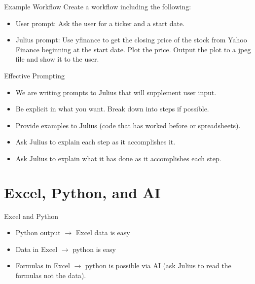 \documentclass[10pt]{beamer}
\begin{document}
\begin{frame}{Example Workflow}
  Create a workflow including the following:
  \begin{itemize}
  \item User prompt: Ask the user for a ticker and a start date.
  \item Julius prompt: Use yfinance to get the closing price of the stock from Yahoo Finance beginning at the start date.  Plot the price.  Output the plot to a jpeg file and show it to the user.
  \end{itemize}
\end{frame}

\begin{frame}{Effective Prompting}
\begin{itemize}
\item We are writing prompts to Julius that will supplement user input.
\item Be explicit in what you want.  Break down into steps if possible.
\item Provide examples to Julius (code that has worked before or spreadsheets).\item Ask Julius to explain each step as it accomplishes it.
\item Ask Julius to explain what it has done as it accomplishes each step.
\end{itemize}
\end{frame}

\section{Excel, Python, and AI}

\begin{frame}{Excel and Python}
\begin{itemize}
  \item Python output $\rightarrow$ Excel data is easy
\item Data in Excel $\rightarrow$ python is easy
\item Formulas in Excel $\rightarrow$ python is possible via AI (ask Julius to read the formulas not the data).
\end{itemize}
\end{frame}
\end{document}
